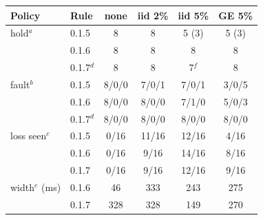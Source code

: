 \begin{tabular}{@{}llcccc@{}}\toprule
Policy & Rule & none & iid 2\% & iid 5\% & GE 5\% \\\midrule
hold$^a$ & 0.1.5 & 8 & 8 & 5 (3) & 5 (3) \\
 & 0.1.6 & 8 & 8 & 8 & 8 \\
 & 0.1.7$^d$ & 8 & 8 & 7$^f$ & 8 \\
fault$^b$ & 0.1.5 & 8/0/0 & 7/0/1 & 7/0/1 & 3/0/5 \\
 & 0.1.6 & 8/0/0 & 8/0/0 & 7/1/0 & 5/0/3 \\
 & 0.1.7$^d$ & 8/0/0 & 8/0/0 & 8/0/0 & 8/0/0 \\
\midrule
loss seen$^c$ & 0.1.5 & 0/16 & 11/16 & 12/16 & 4/16 \\
 & 0.1.6 & 0/16 & 9/16 & 14/16 & 8/16 \\
 & 0.1.7 & 0/16 & 9/16 & 12/16 & 9/16 \\
\midrule
width$^e$ (ms) & 0.1.6 & 46 & 333 & 243 & 275 \\
 & 0.1.7 & 328 & 328 & 149 & 270 \\
\bottomrule\end{tabular}
